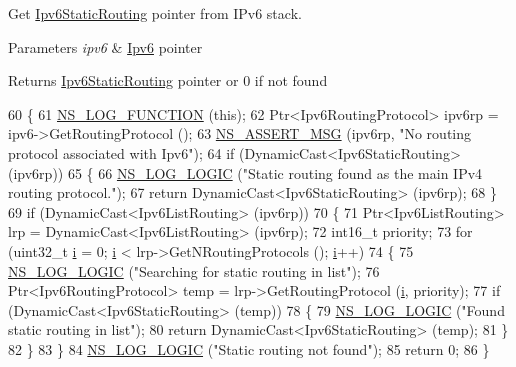 Get \hyperlink{classns3_1_1Ipv6StaticRouting}{Ipv6\+Static\+Routing} pointer from I\+Pv6 stack. 


\begin{DoxyParams}{Parameters}
{\em ipv6} & \hyperlink{classns3_1_1Ipv6}{Ipv6} pointer \\
\hline
\end{DoxyParams}
\begin{DoxyReturn}{Returns}
\hyperlink{classns3_1_1Ipv6StaticRouting}{Ipv6\+Static\+Routing} pointer or 0 if not found 
\end{DoxyReturn}

\begin{DoxyCode}
60 \{
61   \hyperlink{log-macros-disabled_8h_a90b90d5bad1f39cb1b64923ea94c0761}{NS\_LOG\_FUNCTION} (\textcolor{keyword}{this});
62   Ptr<Ipv6RoutingProtocol> ipv6rp = ipv6->GetRoutingProtocol ();
63   \hyperlink{assert_8h_aff5ece9066c74e681e74999856f08539}{NS\_ASSERT\_MSG} (ipv6rp, \textcolor{stringliteral}{"No routing protocol associated with Ipv6"});
64   \textcolor{keywordflow}{if} (DynamicCast<Ipv6StaticRouting> (ipv6rp))
65     \{
66       \hyperlink{group__logging_ga88acd260151caf2db9c0fc84997f45ce}{NS\_LOG\_LOGIC} (\textcolor{stringliteral}{"Static routing found as the main IPv4 routing protocol."});
67       \textcolor{keywordflow}{return} DynamicCast<Ipv6StaticRouting> (ipv6rp); 
68     \} 
69   \textcolor{keywordflow}{if} (DynamicCast<Ipv6ListRouting> (ipv6rp))
70     \{
71       Ptr<Ipv6ListRouting> lrp = DynamicCast<Ipv6ListRouting> (ipv6rp);
72       int16\_t priority;
73       \textcolor{keywordflow}{for} (uint32\_t \hyperlink{bernuolliDistribution_8m_a6f6ccfcf58b31cb6412107d9d5281426}{i} = 0; \hyperlink{bernuolliDistribution_8m_a6f6ccfcf58b31cb6412107d9d5281426}{i} < lrp->GetNRoutingProtocols ();  \hyperlink{bernuolliDistribution_8m_a6f6ccfcf58b31cb6412107d9d5281426}{i}++)
74         \{
75           \hyperlink{group__logging_ga88acd260151caf2db9c0fc84997f45ce}{NS\_LOG\_LOGIC} (\textcolor{stringliteral}{"Searching for static routing in list"});
76           Ptr<Ipv6RoutingProtocol> temp = lrp->GetRoutingProtocol (\hyperlink{bernuolliDistribution_8m_a6f6ccfcf58b31cb6412107d9d5281426}{i}, priority);
77           \textcolor{keywordflow}{if} (DynamicCast<Ipv6StaticRouting> (temp))
78             \{
79               \hyperlink{group__logging_ga88acd260151caf2db9c0fc84997f45ce}{NS\_LOG\_LOGIC} (\textcolor{stringliteral}{"Found static routing in list"});
80               \textcolor{keywordflow}{return} DynamicCast<Ipv6StaticRouting> (temp);
81             \}
82         \}
83     \}
84   \hyperlink{group__logging_ga88acd260151caf2db9c0fc84997f45ce}{NS\_LOG\_LOGIC} (\textcolor{stringliteral}{"Static routing not found"});
85   \textcolor{keywordflow}{return} 0;
86 \}
\end{DoxyCode}


